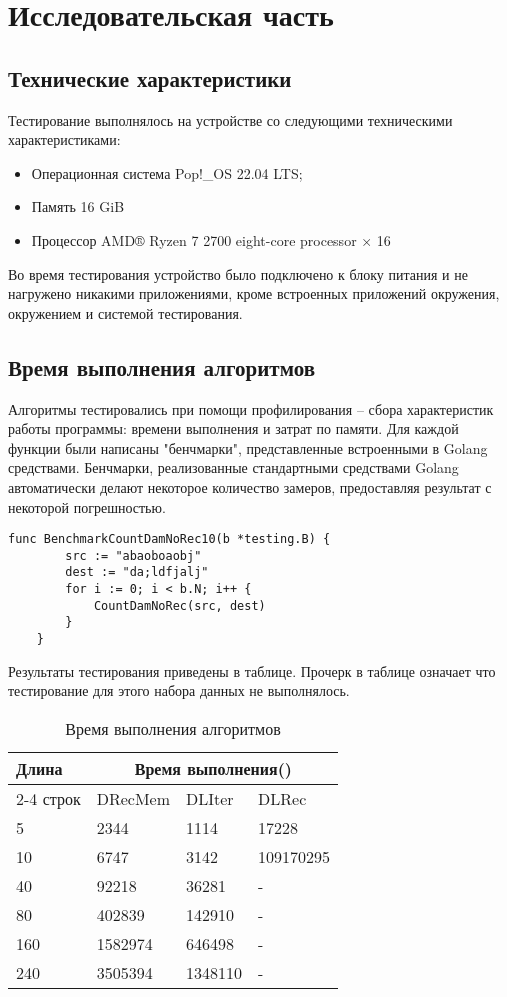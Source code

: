 \chapter{Исследовательская часть}
\section{Технические характеристики}
Тестирование выполнялось на устройстве со следующими техническими характеристиками:
\begin{itemize}
	\item Операционная система Pop!\_OS 22.04 LTS;
	\item Память 16 GiB
	\item Процессор AMD® Ryzen 7 2700 eight-core processor × 16 
\end{itemize}
Во время тестирования устройство было подключено к блоку питания и не нагружено никакими приложениями, кроме встроенных приложений окружения, окружением и системой тестирования.
\section{Время выполнения алгоритмов}
Алгоритмы тестировались при помощи профилирования -- сбора характеристик работы программы: времени выполнения и затрат по памяти. Для каждой функции были написаны "бенчмарки"\cite{test}, представленные встроенными в Golang средствами. Бенчмарки, реализованные стандартными средствами Golang автоматически делают некоторое количество замеров, предоставляя результат с некоторой погрешностью.
\begin{lstlisting}[label=bench,caption=Пример бенчмарка]
	func BenchmarkCountDamNoRec10(b *testing.B) {
		src := "abaoboaobj"
		dest := "da;ldfjalj"
		for i := 0; i < b.N; i++ {
			CountDamNoRec(src, dest)
		}
	}
\end{lstlisting}
Результаты тестирования приведены в таблице. Прочерк в таблице означает что тестирование для этого набора данных не выполнялось.


\begin{table}[h!]
	\begin{center}
		\caption{Время выполнения алгоритмов}
		\begin{tabular}{ ||p{1.5cm}||p{2cm}|p{2cm}|p{3.5cm}||  }
			\hline
			\multirow{2}{*}{Длина}& \multicolumn{3}{c||}{Время выполнения()} \\[1.5ex]
			\cline{2-4} 
			строк& DRecMem & DLIter & DLRec \\ [1.5ex] 
			\hline\hline
			5  & 2344 & 1114 & 17228 \\
			10 & 6747 & 3142 & 109170295 \\
			40 & 92218 & 36281 & - \\
			80 & 402839 & 142910 & - \\
			160 & 1582974 & 646498 & - \\
			240 & 3505394 & 1348110 & - \\
			\hline
		\end{tabular}
		\label{time-table}
	\end{center}
\end{table}

